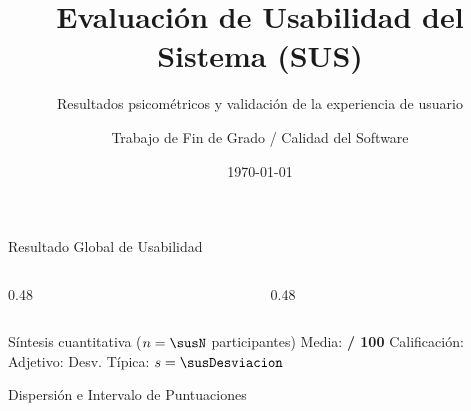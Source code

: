 \documentclass[10pt,aspectratio=169]{beamer}
\title[Evaluación SUS]{Evaluación de Usabilidad del Sistema (SUS)}
\subtitle{Resultados psicométricos y validación de la experiencia de usuario}
\author{Trabajo de Fin de Grado / Calidad del Software}
\date{\today}
\begin{document}
\begin{frame}
  \titlepage
\end{frame}

\begin{frame}{Resultado Global de Usabilidad}
  \begin{columns}[c]
    \begin{column}{0.48\textwidth}
      \centering
      \scalebox{0.78}{}
    \end{column}
    \begin{column}{0.48\textwidth}
      \centering
      \scalebox{0.78}{}
    \end{column}
  \end{columns}

  \vspace{0.4cm}
  \begin{block}{Síntesis cuantitativa ($n = \susN$ participantes)}
    \centering
    Media: \textbf{\susMedia{} / 100} \quad\textbar\quad
    Calificación: \textbf{\susNotaMedia} \quad\textbar\quad
    Adjetivo: \textbf{\susAdjetivoMedia} \quad\textbar\quad
    Desv. Típica: \textbf{$s = \susDesviacion$}
  \end{block}
\end{frame}

\begin{frame}{Dispersión e Intervalo de Puntuaciones}
  \begin{center}
    \scalebox{0.82}{}
  \end{center}

  \vspace{0.2cm}
  \begin{center}
    \scalebox{0.72}{}
  \end{center}
\end{frame}
\end{document}
